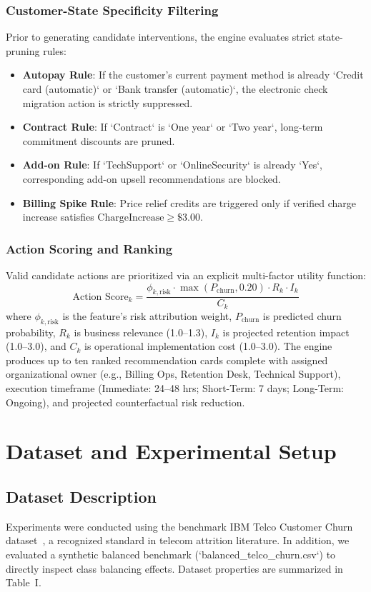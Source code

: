 \documentclass[conference]{IEEEtran}
\begin{document}
\subsubsection{Customer-State Specificity Filtering}
Prior to generating candidate interventions, the engine evaluates strict state-pruning rules:
\begin{itemize}
    \item \textbf{Autopay Rule}: If the customer's current payment method is already `Credit card (automatic)` or `Bank transfer (automatic)`, the electronic check migration action is strictly suppressed.
    \item \textbf{Contract Rule}: If `Contract` is `One year` or `Two year`, long-term commitment discounts are pruned.
    \item \textbf{Add-on Rule}: If `TechSupport` or `OnlineSecurity` is already `Yes`, corresponding add-on upsell recommendations are blocked.
    \item \textbf{Billing Spike Rule}: Price relief credits are triggered only if verified charge increase satisfies $\text{ChargeIncrease} \ge \$3.00$.
\end{itemize}

\subsubsection{Action Scoring and Ranking}
Valid candidate actions are prioritized via an explicit multi-factor utility function:
\begin{equation}
    \text{Action Score}_k = \frac{\phi_{k,\text{risk}} \cdot \max(P_{\text{churn}}, 0.20) \cdot R_k \cdot I_k}{C_k}
\end{equation}
where $\phi_{k,\text{risk}}$ is the feature's risk attribution weight, $P_{\text{churn}}$ is predicted churn probability, $R_k$ is business relevance (1.0--1.3), $I_k$ is projected retention impact (1.0--3.0), and $C_k$ is operational implementation cost (1.0--3.0). The engine produces up to ten ranked recommendation cards complete with assigned organizational owner (e.g., Billing Ops, Retention Desk, Technical Support), execution timeframe (Immediate: 24--48 hrs; Short-Term: 7 days; Long-Term: Ongoing), and projected counterfactual risk reduction.

\section{Dataset and Experimental Setup}

\subsection{Dataset Description}
Experiments were conducted using the benchmark IBM Telco Customer Churn dataset~\cite{ibm_telco}, a recognized standard in telecom attrition literature. In addition, we evaluated a synthetic balanced benchmark (`balanced_telco_churn.csv`) to directly inspect class balancing effects. Dataset properties are summarized in Table~I.
\end{document}
